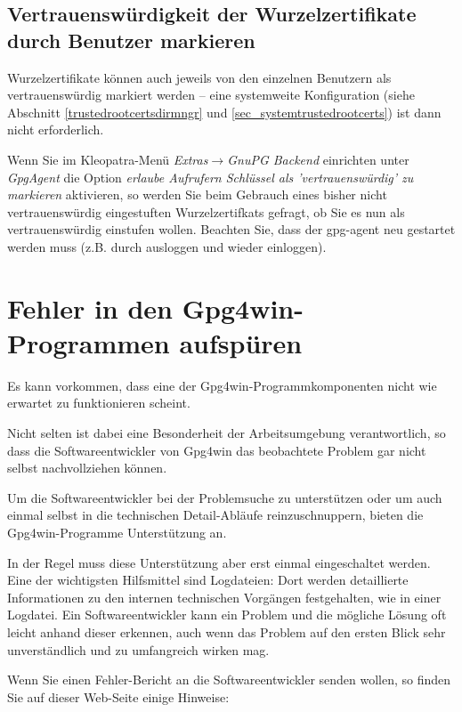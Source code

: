 \documentclass[a4paper,11pt, oneside,openright,titlepage,dvips]{scrbook}
\newcommand{\Menu}[1]{\emph{#1}}
\newcounter{chapter}
\newcounter{section}[chapter]
\begin{document}
\section{Vertrauenswürdigkeit der Wurzelzertifikate durch Benutzer markieren}

Wurzelzertifikate können auch jeweils von den einzelnen Benutzern als
vertrauenswürdig markiert werden -- eine systemweite Konfiguration
(siehe Abschnitt \ref{trustedrootcertsdirmngr} und \ref{sec_systemtrustedrootcerts}) ist dann nicht erforderlich.

Wenn Sie im Kleopatra-Menü \Menu{Extras$\rightarrow$GnuPG Backend} 
einrichten unter \textit{GpgAgent} die Option \textit{erlaube Aufrufern 
Schlüssel als 'vertrauenswürdig' zu markieren} aktivieren, so werden Sie
beim Gebrauch eines bisher nicht vertrauenswürdig eingestuften 
Wurzelzertifkats gefragt, ob Sie es nun als vertrauenswürdig einstufen wollen.
Beachten Sie, dass der gpg-agent neu gestartet werden muss
(z.B. durch ausloggen und wieder einloggen).

\clearpage
{}
\chapter{Fehler in den Gpg4win-Programmen aufspüren}

Es kann vorkommen, dass eine der Gpg4win-Programmkomponenten
nicht wie erwartet zu funktionieren scheint.

Nicht selten ist dabei eine Besonderheit der
Arbeitsumgebung verantwortlich, so dass die Softwareentwickler von
Gpg4win das beobachtete Problem gar nicht selbst nachvollziehen können.

Um die Softwareentwickler bei der Problemsuche zu
unterstützen oder um auch einmal selbst in die technischen
Detail-Abläufe reinzuschnuppern, bieten die Gpg4win-Programme
Unterstützung an.

In der Regel muss diese Unterstützung aber erst einmal
eingeschaltet werden. Eine der wichtigsten Hilfsmittel sind
Logdateien: Dort werden detaillierte Informationen zu den internen
technischen Vorgängen festgehalten, wie in einer Logdatei.
Ein Softwareentwickler kann
ein Problem und die mögliche Lösung oft leicht anhand dieser erkennen,
auch wenn das Problem auf den ersten Blick sehr unverständlich
und zu umfangreich wirken mag.

Wenn Sie einen Fehler-Bericht an die Softwareentwickler
senden wollen, so finden Sie auf dieser Web-Seite einige Hinweise:
\end{document}
